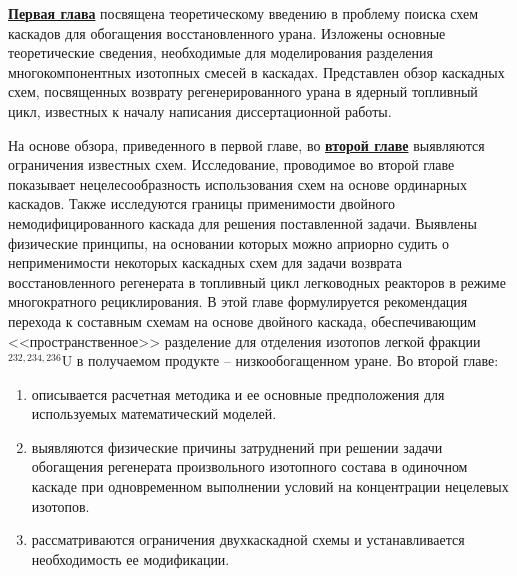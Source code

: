 \underline{\textbf{Первая глава}} посвящена теоретическому введению в проблему поиска схем каскадов для обогащения восстановленного урана. Изложены основные теоретические сведения, необходимые для моделирования разделения многокомпонентных изотопных смесей в каскадах. Представлен обзор каскадных схем, посвященных возврату регенерированного урана в ядерный топливный цикл, известных к началу написания диссертационной работы.

На основе обзора, приведенного в первой главе, во \underline{\textbf{второй главе}}  выявляются ограничения известных схем. Исследование, проводимое во второй главе показывает  нецелесообразность использования схем на основе ординарных каскадов. Также исследуются границы применимости двойного немодифицированного каскада для решения поставленной задачи. Выявлены физические принципы, на основании которых можно априорно судить о неприменимости некоторых каскадных схем для задачи возврата восстановленного регенерата в топливный цикл легководных реакторов в режиме многократного рециклирования. В этой главе формулируется рекомендация перехода к составным схемам на основе двойного каскада, обеспечивающим <<пространственное>> разделение для отделения изотопов легкой фракции $^{232,234,236}$U в получаемом продукте -- низкообогащенном уране.
Во второй главе:
\begin{enumerate}
  \item описывается расчетная методика и ее основные предположения для используемых математический моделей.
  \item выявляются физические причины затруднений при решении задачи обогащения регенерата произвольного изотопного состава в одиночном каскаде при одновременном выполнении условий на концентрации нецелевых изотопов.
  \item рассматриваются ограничения двухкаскадной схемы и устанавливается необходимость ее модификации.
\end{enumerate}

